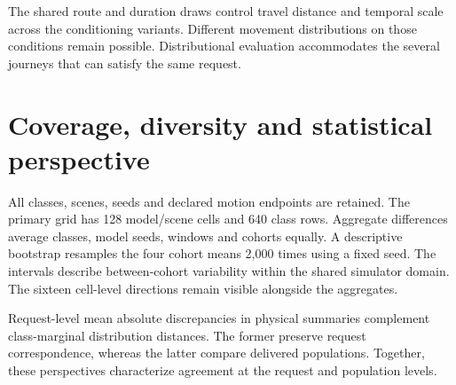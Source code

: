 
The shared route and duration draws control travel distance and temporal scale across the conditioning variants. Different movement distributions on those conditions remain possible. Distributional evaluation accommodates the several journeys that can satisfy the same request.

\section{Coverage, diversity and statistical perspective}
\label{sec:statistical-perspectives}
All classes, scenes, seeds and declared motion endpoints are retained. The primary grid has 128 model/scene cells and 640 class rows. Aggregate differences average classes, model seeds, windows and cohorts equally. A descriptive bootstrap resamples the four cohort means 2,000 times using a fixed seed. The intervals describe between-cohort variability within the shared simulator domain. The sixteen cell-level directions remain visible alongside the aggregates.

Request-level mean absolute discrepancies in physical summaries complement class-marginal distribution distances. The former preserve request correspondence, whereas the latter compare delivered populations. Together, these perspectives characterize agreement at the request and population levels.


